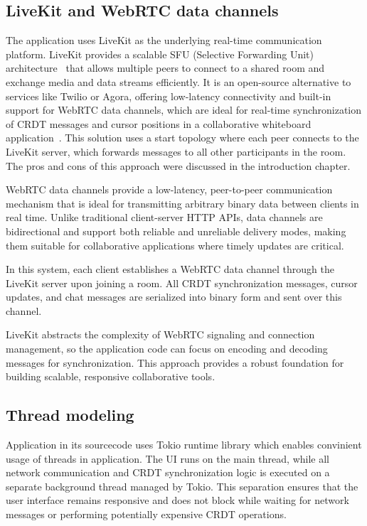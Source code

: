 \documentclass[a4paper,11pt,twoside]{report}
\theoremstyle{definition}
\begin{document}
\subsection{LiveKit and WebRTC data channels}
The application uses LiveKit as the underlying real-time communication platform. 
LiveKit provides a scalable SFU (Selective Forwarding Unit) architecture~\cite{livekit-sfu} that 
allows multiple peers to connect to a shared room and exchange media and 
data streams efficiently. It is an open-source alternative to services like 
Twilio or Agora, offering low-latency connectivity and built-in support for 
WebRTC data channels, which are ideal for real-time synchronization of CRDT 
messages and cursor positions in a collaborative whiteboard application~\cite{conclave, mdn-webrtc}.
This solution uses a start topology where each peer connects to the LiveKit server,
 which forwards messages to all other participants in the room. The pros and 
 cons of this approach were discussed in the introduction chapter.


WebRTC data channels provide a low-latency, peer-to-peer communication
 mechanism that is ideal for transmitting arbitrary binary data between 
 clients in real time. Unlike traditional client-server HTTP APIs, data 
 channels are bidirectional and support both reliable and unreliable delivery 
 modes, making them suitable for collaborative applications where timely 
 updates are critical.

In this system, each client establishes a WebRTC data channel through the LiveKit 
server upon joining a room. All CRDT synchronization messages, cursor updates, and 
chat messages are serialized into binary form and sent over this channel. 

LiveKit abstracts the complexity of WebRTC signaling and connection management, 
so the application code can focus on encoding and decoding messages for 
synchronization. This approach provides a robust foundation for building scalable,
 responsive collaborative tools.


\subsection{Thread modeling}
Application in its sourcecode uses Tokio runtime library which enables 
convinient usage of threads in application. The UI runs on the main thread, 
while all network communication and CRDT synchronization logic is executed 
on a separate background thread managed by Tokio. This separation ensures that the user interface remains responsive and
 does not block while waiting for network messages or performing 
 potentially expensive CRDT operations.
\end{document}
